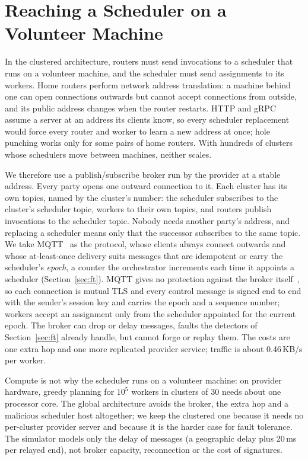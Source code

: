 \section{Reaching a Scheduler on a Volunteer Machine}
\label{sec:network}
\label{sec:broker}
\label{sec:placement}

In the clustered architecture, routers must send invocations to a scheduler that runs on a volunteer machine, and the
scheduler must send assignments to its workers. Home routers perform network address translation: a machine behind one can
open connections outwards but cannot accept connections from outside, and its public address changes when the router
restarts. HTTP and gRPC assume a server at an address its clients know, so every scheduler replacement would force every
router and worker to learn a new address at once; hole punching works only for some pairs of home routers. With hundreds of
clusters whose schedulers move between machines, neither scales.

We therefore use a publish/subscribe broker run by the provider at a stable address. Every party opens one outward
connection to it. Each cluster has its own topics, named by the cluster's number: the scheduler subscribes to the cluster's
scheduler topic, workers to their own topics, and routers publish invocations to the scheduler topic. Nobody needs another
party's address, and replacing a scheduler means only that the successor subscribes to the same topic. We take
MQTT~\cite{mqtt5} as the protocol, whose clients always connect outwards and whose at-least-once delivery suits messages
that are idempotent or carry the scheduler's \emph{epoch}, a counter the orchestrator increments each time it appoints a scheduler (Section~\ref{sec:ft}). MQTT gives no protection against the broker itself~\cite{buccafurri2024mqtti},
so each connection is mutual TLS and every control message is signed end to end with the sender's session key and carries
the epoch and a sequence number; workers accept an assignment only from the scheduler appointed for the current epoch. The
broker can drop or delay messages, faults the detectors of Section~\ref{sec:ft} already handle, but cannot forge or replay
them. The costs are one extra hop and one more replicated provider service; traffic is about 0.46\,KB/s per worker.

Compute is not why the scheduler runs on a volunteer machine: on provider hardware, greedy planning for $10^5$ workers in
clusters of 30 needs about one processor core. The global architecture avoids the broker, the extra hop and a malicious
scheduler host altogether; we keep the clustered one because it needs no per-cluster provider server and because it is the
harder case for fault tolerance. The simulator models only the delay of messages (a geographic delay plus 20\,ms per relayed
end), not broker capacity, reconnection or the cost of signatures.
